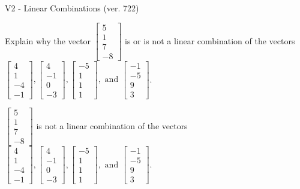 \begin{exercise}
  \begin{exerciseTitle}V2 - Linear Combinations (ver. 722)\end{exerciseTitle}
  \begin{exerciseStatement}
    Explain why the vector \(\left[\begin{array}{c}
5 \\
1 \\
7 \\
-8
\end{array}\right]\)  is or is not a linear 
	combination of the vectors \(\left[\begin{array}{c}
4 \\
1 \\
-4 \\
-1
\end{array}\right] , \left[\begin{array}{c}
4 \\
-1 \\
0 \\
-3
\end{array}\right] , \left[\begin{array}{c}
-5 \\
1 \\
1 \\
1
\end{array}\right] , \text{ and } \left[\begin{array}{c}
-1 \\
-5 \\
9 \\
3
\end{array}\right]\).
	


  \end{exerciseStatement}
  \begin{exerciseAnswer}
   \(\left[\begin{array}{c}
5 \\
1 \\
7 \\
-8
\end{array}\right]\) 
  	 is not  
	a linear combination of the vectors \(\left[\begin{array}{c}
4 \\
1 \\
-4 \\
-1
\end{array}\right] , \left[\begin{array}{c}
4 \\
-1 \\
0 \\
-3
\end{array}\right] , \left[\begin{array}{c}
-5 \\
1 \\
1 \\
1
\end{array}\right] , \text{ and } \left[\begin{array}{c}
-1 \\
-5 \\
9 \\
3
\end{array}\right]\).


\end{exerciseAnswer}
\end{exercise}
